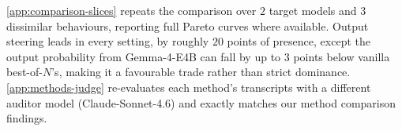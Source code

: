 \documentclass{article}
\begin{document}
\cref{app:comparison-slices} repeats the comparison over $2$ target models and $3$ dissimilar behaviours, reporting full Pareto curves where available. Output steering leads in every setting, by roughly $20$ points of presence, except the output probability from Gemma-4-E4B can fall by up to $3$ points below vanilla best-of-$N$'s, making it a favourable trade rather than strict dominance. \cref{app:methods-judge} re-evaluates each method's transcripts with a different auditor model (Claude-Sonnet-4.6) and exactly matches our method comparison findings.










\end{document}
